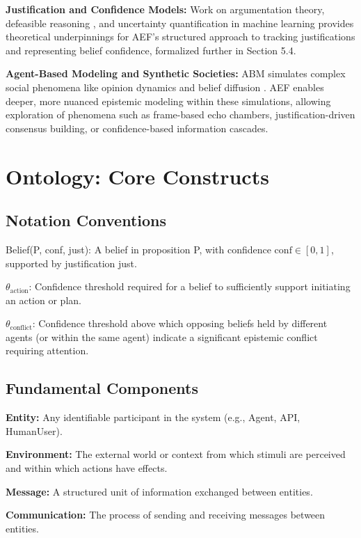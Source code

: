 \documentclass[10pt,a4paper]{article}
\begin{document}
\textbf{Justification and Confidence Models:} Work on argumentation theory, defeasible reasoning \citep{justification_models1, justification_models}, and uncertainty quantification in machine learning \citep{gal2016dropout} provides theoretical underpinnings for AEF's structured approach to tracking justifications and representing belief confidence, formalized further in Section 5.4.

\textbf{Agent-Based Modeling and Synthetic Societies:} ABM simulates complex social phenomena like opinion dynamics and belief diffusion \citep{epstein1996growing, abm_dynamic1, wooldridge2009multiagent}. AEF enables deeper, more nuanced epistemic modeling within these simulations, allowing exploration of phenomena such as frame-based echo chambers, justification-driven consensus building, or confidence-based information cascades.

\section{Ontology: Core Constructs}
\subsection{Notation Conventions}
Belief(P, conf, just): A belief in proposition P, with confidence $\mathrm{conf} \in [0,1]$, supported by justification just.

$\theta_{\mathrm{action}}$: Confidence threshold required for a belief to sufficiently support initiating an action or plan.

$\theta_{\mathrm{conflict}}$: Confidence threshold above which opposing beliefs held by different agents (or within the same agent) indicate a significant epistemic conflict requiring attention.

\subsection{Fundamental Components}
\textbf{Entity:} Any identifiable participant in the system (e.g., Agent, API, HumanUser).

\textbf{Environment:} The external world or context from which stimuli are perceived and within which actions have effects.

\textbf{Message:} A structured unit of information exchanged between entities.

\textbf{Communication:} The process of sending and receiving messages between entities.
\end{document}
